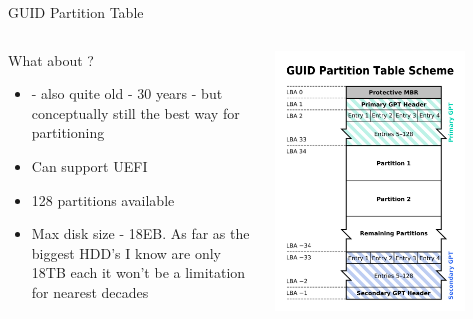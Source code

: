 \documentclass[usenames,dvipsnames,10pt,aspectratio=169]{beamer}
\begin{document}
\begin{frame}{GUID Partition Table} 
        

    {
        
        \begin{columns}[t, totalwidth=\textwidth]
        \begin{column}{0.47\linewidth}
            \begin{center}
                What about ?
                \begin{itemize}
                    \item {} - also quite old - 30 years - but conceptually still the best way for partitioning
                    \item Can support UEFI
                    \item 128 partitions available
                    \item Max disk size - 18EB. As far as the biggest HDD's I know are only 18TB each it won't be a limitation for nearest decades
                \end{itemize}    
            \end{center}
        \end{column}

        \begin{column}{0.47\linewidth}
            \begin{center}
                \includegraphics[width=0.8\textwidth]{graphics/GPT.png}    
            \end{center}
        \end{column}

    \end{columns}
    }

\end{frame}
\end{document}
